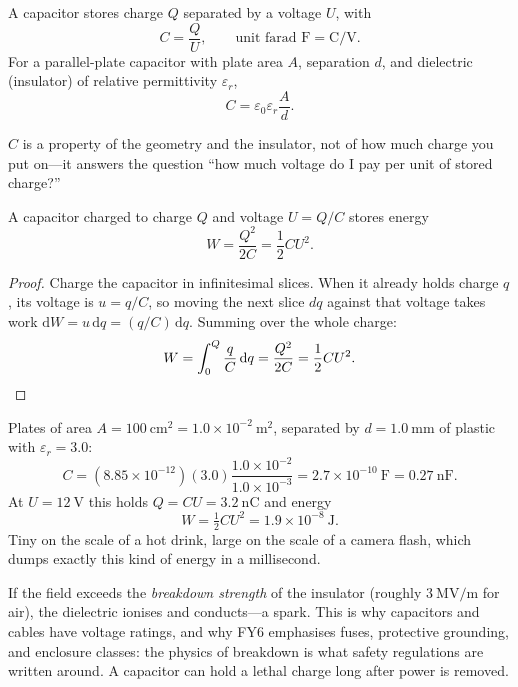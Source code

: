 \begin{definition}[Capacitance]\label{def:capacitance}
A capacitor stores charge $Q$ separated by a voltage $U$, with
\[
  C = \frac{Q}{U}, \qquad \text{unit farad } \mathrm{F} = \mathrm{C/V}.
\]
For a parallel-plate capacitor with plate area $A$, separation $d$, and dielectric (insulator) of relative permittivity $\varepsilon_r$,
\begin{equation}\label{eq:parallel-plate-C}
  C = \varepsilon_0\varepsilon_r\frac{A}{d}.
\end{equation}
\end{definition}

$C$ is a property of the geometry and the insulator, not of how much charge you put on---it answers the question ``how much voltage do I pay per unit of stored charge?''

\begin{proposition}\label{prop:cap-energy}
A capacitor charged to charge $Q$ and voltage $U = Q/C$ stores energy
\[
  W = \frac{Q^{2}}{2C} = \frac{1}{2}CU^{2}.
\]
\end{proposition}

\begin{proof}
Charge the capacitor in infinitesimal slices. When it already holds charge $q$, its voltage is $u = q/C$, so moving the next slice $dq$ against that voltage takes work $\mathrm{d}W = u\,\mathrm{d}q = (q/C)\,\mathrm{d}q$. Summing over the whole charge:
\[
  W = \int_0^Q \frac{q}{C}\,\mathrm{d}q = \frac{Q^2}{2C} = \frac{1}{2}CU^{2}. \qedhere
\]
\end{proof}

\begin{example}\label{exm:capacitor}
Plates of area $A = 100\ \mathrm{cm^2} = 1.0\times 10^{-2}\ \mathrm{m^2}$, separated by $d = 1.0\ \mathrm{mm}$ of plastic with $\varepsilon_r = 3.0$:
\[
  C = (8.85\times 10^{-12})(3.0)\frac{1.0\times 10^{-2}}{1.0\times 10^{-3}} = 2.7\times 10^{-10}\ \mathrm{F} = 0.27\ \mathrm{nF}.
\]
At $U = 12\ \mathrm{V}$ this holds $Q = CU = 3.2\ \mathrm{nC}$ and energy
\[
  W = \tfrac{1}{2}CU^{2} = 1.9\times 10^{-8}\ \mathrm{J}.
\]
Tiny on the scale of a hot drink, large on the scale of a camera flash, which dumps exactly this kind of energy in a millisecond.
\end{example}

\begin{remark}\label{rmk:breakdown}
If the field exceeds the \emph{breakdown strength} of the insulator (roughly $3\ \mathrm{MV/m}$ for air), the dielectric ionises and conducts---a spark. This is why capacitors and cables have voltage ratings, and why FY6 emphasises fuses, protective grounding, and enclosure classes: the physics of breakdown is what safety regulations are written around. A capacitor can hold a lethal charge long after power is removed.
\end{remark}

